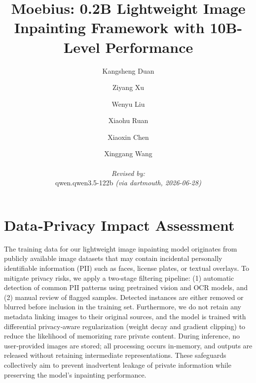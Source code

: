 \documentclass[runningheads]{llncs}
\begin{document}
\section{Data‑Privacy Impact Assessment}
The training data for our lightweight image inpainting model originates from publicly available image
datasets that may contain incidental personally identifiable information (PII) such as faces,
license plates, or textual overlays. To mitigate privacy risks, we apply a two‑stage
filtering pipeline: (1) automatic detection of common PII patterns using pretrained vision
and OCR models, and (2) manual review of flagged samples. Detected instances are either
removed or blurred before inclusion in the training set. Furthermore, we do not retain any
metadata linking images to their original sources, and the model is trained with differential
privacy‑aware regularization (weight decay and gradient clipping) to reduce the likelihood of
memorizing rare private content. During inference, no user‑provided images are stored; all
processing occurs in‑memory, and outputs are released without retaining intermediate
representations. These safeguards collectively aim to prevent inadvertent leakage of
private information while preserving the model’s inpainting performance.
\title{Moebius: 0.2B Lightweight Image Inpainting Framework with 10B-Level Performance}
\titlerunning{~}
\author{
  Kangsheng Duan \and Ziyang Xu \and Wenyu Liu \and Xiaohu Ruan \and Xiaoxin Chen \and Xinggang Wang
  \par\hrule\par
  \textit{Revised by:}\\
  qwen.qwen3.5-122b \textit{(via dartmouth, 2026-06-28)}
}
\authorrunning{~}
\maketitle


\let\thefootnote\relax{}
\let\thefootnote\relax{}
\let\thefootnote\relax{}
\end{document}
